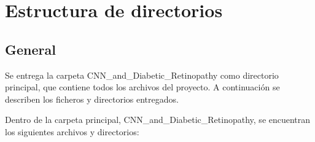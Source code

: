 
\section{Estructura de directorios}

\subsection{General}

Se entrega la carpeta CNN\_and\_Diabetic\_Retinopathy como directorio principal, que contiene todos los archivos del proyecto. A continuación se describen los ficheros y directorios entregados.

Dentro de la carpeta principal, CNN\_and\_Diabetic\_Retinopathy, se encuentran los siguientes archivos y directorios:

